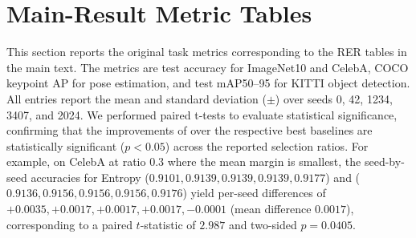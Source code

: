 \section{Main-Result Metric Tables}
\label{app:main-metric-tables}

This section reports the original task metrics corresponding to the RER tables in the main text. The metrics are test accuracy for ImageNet10 and CelebA, COCO keypoint AP for pose estimation, and test mAP50--95 for KITTI object detection. All entries report the mean and standard deviation ($\pm$) over seeds 0, 42, 1234, 3407, and 2024. We performed paired t-tests to evaluate statistical significance, confirming that the improvements of \model over the respective best baselines are statistically significant ($p < 0.05$) across the reported selection ratios. For example, on CelebA at ratio $0.3$ where the mean margin is smallest, the seed-by-seed accuracies for Entropy ($0.9101, 0.9139, 0.9139, 0.9139, 0.9177$) and \model ($0.9136, 0.9156, 0.9156, 0.9156, 0.9176$) yield per-seed differences of $+0.0035, +0.0017, +0.0017, +0.0017, -0.0001$ (mean difference $0.0017$), corresponding to a paired $t$-statistic of $2.987$ and two-sided $p = 0.0405$.

